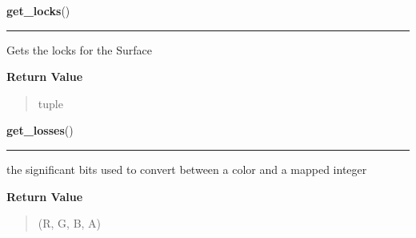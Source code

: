     \label{pygame:Surface:get_locks}

    \vspace{0.5ex}

\hspace{.8\funcindent}\begin{boxedminipage}{\funcwidth}

    \raggedright \textbf{get\_locks}()

    \vspace{-1.5ex}

    \rule{\textwidth}{0.5\fboxrule}
\setlength{\parskip}{2ex}
    Gets the locks for the Surface

\setlength{\parskip}{1ex}
      \textbf{Return Value}
    \vspace{-1ex}

      \begin{quote}
      tuple

      \end{quote}

    \end{boxedminipage}

    \label{pygame:Surface:get_losses}

    \vspace{0.5ex}

\hspace{.8\funcindent}\begin{boxedminipage}{\funcwidth}

    \raggedright \textbf{get\_losses}()

    \vspace{-1.5ex}

    \rule{\textwidth}{0.5\fboxrule}
\setlength{\parskip}{2ex}
    the significant bits used to convert between a color and a mapped 
    integer

\setlength{\parskip}{1ex}
      \textbf{Return Value}
    \vspace{-1ex}

      \begin{quote}
      (R, G, B, A)

      \end{quote}

    \end{boxedminipage}

    \label{pygame:Surface:get_masks}

    \vspace{0.5ex}

